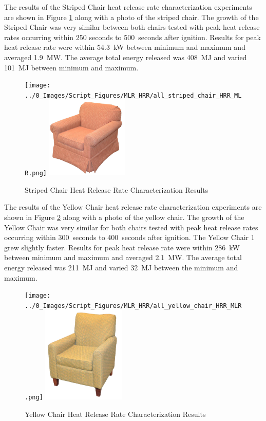 \documentclass[12pt,oneside]{book}
\begin{document}
\clearpage

The results of the Striped Chair heat release rate characterization experiments are shown in Figure \ref{fig:striped_chair_HRR} along with a photo of the striped chair. The growth of the Striped Chair was very similar between both chairs tested with peak heat release rates occurring within 250 seconds to 500~seconds after ignition. Results for peak heat release rate were within 54.3~kW between minimum and maximum and averaged 1.9~MW. The average total energy released was 408~MJ and varied 101~MJ between minimum and maximum. 

\begin{figure}[H]
	\centering
	\texttt{[image: ../0\_Images/Script\_Figures/MLR\_HRR/all\_striped\_chair\_HRR\_MLR.png]}
	\includegraphics[width=0.35\textwidth]{../0_Images/Fuel/Striped_Chair.jpg}
	\caption{Striped Chair Heat Release Rate Characterization Results}
	\label{fig:striped_chair_HRR}
\end{figure}

The results of the Yellow Chair heat release rate characterization experiments are shown in Figure \ref{fig:yellow_chair_HRR} along with a photo of the yellow chair. The growth of the Yellow Chair was very similar for both chairs tested with peak heat release rates occurring within 300~seconds to 400~seconds after ignition. The Yellow Chair 1 grew slightly faster. Results for peak heat release rate were within 286~kW between minimum and maximum and averaged 2.1~MW. The average total energy released was 211~MJ and varied 32~MJ between the minimum and maximum. 

\begin{figure}[H]
	\centering
	\texttt{[image: ../0\_Images/Script\_Figures/MLR\_HRR/all\_yellow\_chair\_HRR\_MLR.png]}
	\includegraphics[width=0.35\textwidth]{../0_Images/Fuel/Yellow_Chair.jpg}
	\caption{Yellow Chair Heat Release Rate Characterization Results}
	\label{fig:yellow_chair_HRR}
\end{figure}
\end{document}
